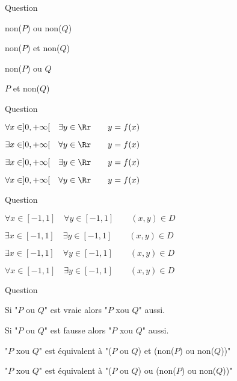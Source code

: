 \begin{multi}[multiple,feedback=
{La définition (à connaître) de "\(P \implies Q\)" est "non(\(P\)) ou \(Q\)".
}]{Question}
    \item non(\(P\)) ou non(\(Q\))
    \item non(\(P\)) et non(\(Q\))
    \item* non(\(P\)) ou \(Q\)
    \item \(P\) et non(\(Q\))
\end{multi}


\begin{multi}[multiple,feedback=
{L'ordre des "pour tout" et "il existe" est très important.
}]{Question}
    \item* \(\forall x \in ]0,+\infty[ \quad \exists y \in \Rr \qquad y = f(x)\)
    \item \(\exists x \in ]0,+\infty[ \quad \forall y \in \Rr \qquad y = f(x)\)
    \item* \(\exists x \in ]0,+\infty[ \quad \exists y \in \Rr \qquad y = f(x)\)
    \item \(\forall x \in ]0,+\infty[ \quad \forall y \in \Rr \qquad y = f(x)\)
\end{multi}


\begin{multi}[multiple,feedback=
{Faire un dessin permet de mieux comprendre la situation !
}]{Question}
    \item \(\forall x \in [-1,1] \quad \forall y \in [-1,1] \qquad (x,y) \in D\)
    \item* \(\exists x \in [-1,1] \quad \exists y \in [-1,1] \qquad (x,y) \in D\)
    \item* \(\exists x \in [-1,1] \quad \forall y \in [-1,1] \qquad (x,y) \in D\)
    \item* \(\forall x \in [-1,1] \quad \exists y \in [-1,1] \qquad (x,y) \in D\)
\end{multi}


\begin{multi}[multiple,feedback=
{Commencer par faire la table de vérité de "\(P\) ou \(Q\)".
}]{Question}
    \item Si "\(P\) ou \(Q\)" est vraie alors "\(P\) xou \(Q\)" aussi.
    \item* Si "\(P\) ou \(Q\)" est fausse alors "\(P\) xou \(Q\)" aussi.
    \item* "\(P\) xou \(Q\)" est équivalent à "(\(P\) ou \(Q\)) et (non(\(P\)) ou non(\(Q\)))"
    \item "\(P\) xou \(Q\)" est équivalent à "(\(P\) ou \(Q\)) ou (non(\(P\)) ou non(\(Q\)))"
\end{multi}


